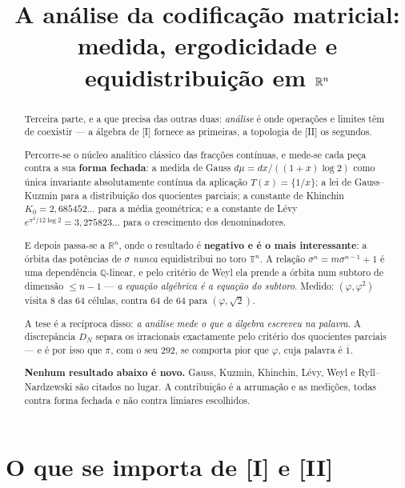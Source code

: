 \documentclass[11pt,a4paper]{article}
\title{A análise da codificação matricial:\\ medida, ergodicidade e equidistribuição em $\R^n$}
\author{}
\date{}
\theoremstyle{plain}
\theoremstyle{definition}
\theoremstyle{remark}
\newcommand{\R}{\mathbb{R}}
\newcommand{\Q}{\mathbb{Q}}
\begin{document}
\maketitle

\begin{abstract}
Terceira parte, e a que precisa das outras duas: \emph{análise} é onde operações e limites têm de
coexistir --- a álgebra de [I] fornece as primeiras, a topologia de [II] os segundos.

Percorre-se o núcleo analítico clássico das fracções contínuas, e mede-se cada peça contra a sua
\textbf{forma fechada}: a medida de Gauss $d\mu = dx/((1+x)\log2)$ como única invariante
absolutamente contínua da aplicação $T(x)=\{1/x\}$; a lei de Gauss--Kuzmin para a distribuição dos
quocientes parciais; a constante de Khinchin $K_0 = 2{,}685452\ldots$ para a média geométrica; e a
constante de Lévy $e^{\pi^2/12\log2} = 3{,}275823\ldots$ para o crescimento dos denominadores.

E depois passa-se a $\R^n$, onde o resultado é \textbf{negativo e é o mais interessante}: a órbita
das potências de $\sigma$ \emph{nunca} equidistribui no toro $\mathbb T^n$. A relação
$\sigma^n = m\sigma^{n-1}+1$ é uma dependência $\Q$-linear, e pelo critério de Weyl ela prende a
órbita num subtoro de dimensão $\leq n-1$ --- \emph{a equação algébrica é a equação do subtoro}.
Medido: $(\varphi,\varphi^2)$ visita $8$ das $64$ células, contra $64$ de $64$ para
$(\varphi,\sqrt2)$.

A tese é a recíproca disso: \emph{a análise mede o que a álgebra escreveu na palavra}. A
discrepância $D_N$ separa os irracionais exactamente pelo critério dos quocientes parciais --- e é
por isso que $\pi$, com o seu $292$, se comporta pior que $\varphi$, cuja palavra é $\overline1$.

\medskip
\noindent\textbf{Nenhum resultado abaixo é novo.} Gauss, Kuzmin, Khinchin, Lévy, Weyl e
Ryll--Nardzewski são citados no lugar. A contribuição é a arrumação e as medições, todas contra
forma fechada e não contra limiares escolhidos.
\end{abstract}

\section{O que se importa de [I] e [II]}\label{sec:importa3}
\end{document}
